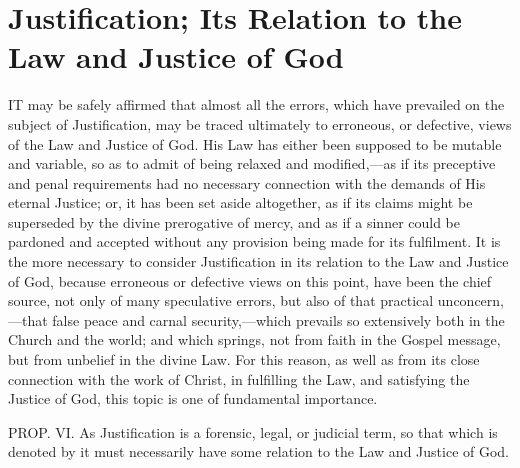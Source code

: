 \documentclass[
]{book}
\begin{document}
\hypertarget{justification-its-relation-to-the-law-and-justice-of-god}{%
\chapter{Justification; Its Relation to the Law and Justice of God}\label{justification-its-relation-to-the-law-and-justice-of-god}}

IT may be safely affirmed that almost all the errors, which have prevailed on the subject of Justification, may be traced ultimately to erroneous, or defective, views of the Law and Justice of God. His Law has either been supposed to be mutable and variable, so as to admit of being relaxed and modified,---as if its preceptive and penal requirements had no necessary connection with the demands of His eternal Justice; or, it has been set aside altogether, as if its claims might be superseded by the divine prerogative of mercy, and as if a sinner could be pardoned and accepted without any provision being made for its fulfilment. It is the more necessary to consider Justification in its relation to the Law and Justice of God, because erroneous or defective views on this point, have been the chief source, not only of many speculative errors, but also of that practical unconcern,---that false peace and carnal security,---which prevails so extensively both in the Church and the world; and which springs, not from faith in the Gospel message, but from unbelief in the divine Law. For this reason, as well as from its close connection with the work of Christ, in fulfilling the Law, and satisfying the Justice of God, this topic is one of fundamental importance.

PROP. VI. As Justification is a forensic, legal, or judicial term, so that which is denoted by it must necessarily have some relation to the Law and Justice of God.
\end{document}
